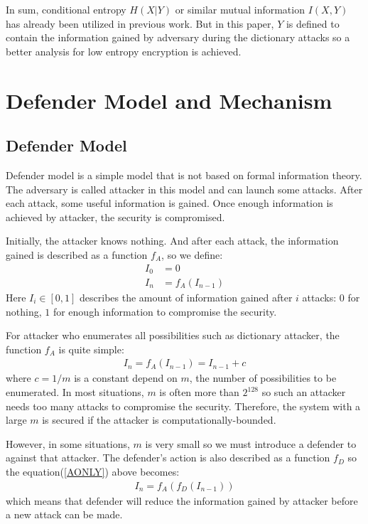 \documentclass[10pt, conference, compsocconf]{IEEEtran}
\begin{document}
	In sum, conditional entropy $H(X|Y)$ or similar mutual information $I(X, Y)$
	has already been utilized in previous work. But in this paper, $Y$ is defined to contain the information
	gained by adversary during the dictionary attacks so a better analysis
	for low entropy encryption is achieved.
	
\section{Defender Model and Mechanism}
	\subsection{Defender Model}
		Defender model is a simple model that
		is not based on formal information theory.
		The adversary is called attacker in this model
		and can launch some attacks. After
		each attack, some useful information is gained.
		Once enough information is achieved by attacker, 
		the security is compromised.
		
		Initially, the attacker knows nothing. And after
		each attack, the information gained
		is described as a function $f_A$, so we define:
		\begin{align}
			I_0 &= 0\\
			I_n &= f_A(I_{n-1})\label{AONLY}
		\end{align}
		Here $I_i \in [0, 1]$ describes the amount of information
		gained after $i$ attacks: $0$ for nothing, $1$ for enough
		information to compromise the security.
		
		For attacker who enumerates all possibilities such
		as dictionary attacker, the
		function $f_A$ is quite simple:
		\begin{align}
			I_n = f_A(I_{n-1}) = I_{n-1}+c\label{AONLYE}
		\end{align}
		where $c = 1/m$ is a constant depend on $m$,
		the number of possibilities to be enumerated. 
		In most situations, $m$ is often more
		than $2^{128}$ so such an attacker needs too many 
		attacks to compromise the security. Therefore, the system with
		a large $m$ is secured if the attacker is computationally-bounded.
		
		However, in some situations, $m$ is very small so
		we must introduce a defender to against that attacker. 
		The defender's action is also described as a function $f_D$
		so the equation(\ref{AONLY}) above becomes:
		\begin{align}
			I_n = f_A(f_D(I_{n-1}))
		\end{align}
		which means that defender will reduce the information
		gained by attacker before a new attack can be made.
		
\end{document}
